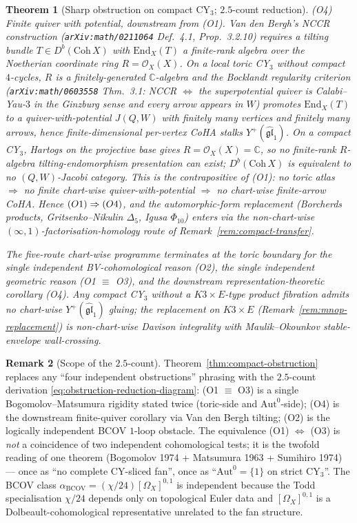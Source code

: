 \documentclass[11pt]{amsart}
\newtheorem{theorem}{Theorem}[section]
\theoremstyle{definition}
\newtheorem{remark}[theorem]{Remark}
\providecommand{\cO}{\mathcal{O}}
\providecommand{\End}{\mathrm{End}}
\providecommand{\bC}{\mathbb{C}}
\providecommand{\fgl}{\mathfrak{gl}}
\begin{document}
\begin{theorem}[Sharp obstruction on compact CY$_3$; $2.5$-count reduction]
\smallskip
\emph{\textup{(O4)} Finite quiver with potential, downstream from
\textup{(O1)}.}
Van den Bergh's NCCR construction (\texttt{arXiv:math/0211064}
Def.~4.1, Prop.~3.2.10) requires a tilting bundle $T \in
D^b(\mathrm{Coh}\,X)$ with $\End_X(T)$ a finite-rank algebra over
the Noetherian coordinate ring $R = \cO_X(X)$. On a local toric
CY$_3$ without compact $4$-cycles, $R$ is a finitely-generated
$\bC$-algebra and the Bocklandt regularity criterion
(\texttt{arXiv:math/0603558} Thm.~3.1: NCCR $\Leftrightarrow$ the
superpotential quiver is Calabi--Yau-$3$ in the Ginzburg sense and
every arrow appears in $W$) promotes $\End_X(T)$ to a
quiver-with-potential $J(Q, W)$ with finitely many vertices and
finitely many arrows, hence finite-dimensional per-vertex CoHA
stalks $Y^+(\widehat{\fgl}_1)$. On a compact CY$_3$, Hartogs on the
projective base gives $R = \cO_X(X) = \bC$, so no finite-rank
$R$-algebra tilting-endomorphism presentation can exist;
$D^b(\mathrm{Coh}\,X)$ is equivalent to no $(Q, W)$-Jacobi category.
This is the contrapositive of (O1): \emph{no toric atlas
$\Rightarrow$ no finite chart-wise quiver-with-potential
$\Rightarrow$ no chart-wise finite-arrow CoHA}. Hence
$\textup{(O1)} \Rightarrow \textup{(O4)}$, and the automorphic-form
replacement (Borcherds products, Gritsenko--Nikulin $\Delta_5$,
Igusa $\Phi_{10}$) enters via the non-chart-wise
$(\infty,1)$-factorisation-homology route of
Remark~\ref{rem:compact-transfer}.

\smallskip
The five-route chart-wise programme terminates at the toric boundary
for the single independent BV-cohomological reason (O2), the single
independent geometric reason (O1 $\equiv$ O3), and the downstream
representation-theoretic corollary (O4). Any compact CY$_3$ without
a $K3 \times E$-type product fibration admits no chart-wise
$Y^+(\widehat{\fgl}_1)$ gluing; the replacement on $K3 \times E$
(Remark~\ref{rem:mnop-replacement}) is non-chart-wise Davison
integrality with Maulik--Okounkov stable-envelope wall-crossing.
\end{theorem}

\begin{remark}[Scope of the $2.5$-count]
\label{rem:obstruction-2p5-scope}
Theorem~\ref{thm:compact-obstruction} replaces any ``four
independent obstructions'' phrasing with the $2.5$-count derivation
\eqref{eq:obstruction-reduction-diagram}: (O1 $\equiv$ O3) is a
single Bogomolov--Matsumura rigidity stated twice (toric-side and
$\mathrm{Aut}^0$-side); (O4) is the downstream finite-quiver
corollary via Van den Bergh tilting; (O2) is the logically
independent BCOV $1$-loop obstacle. The equivalence (O1)
$\Leftrightarrow$ (O3) is \emph{not} a coincidence of two
independent cohomological tests; it is the twofold reading of one
theorem (Bogomolov 1974 + Matsumura 1963 + Sumihiro 1974) --- once as
``no complete CY-sliced fan'', once as ``$\mathrm{Aut}^0 = \{1\}$ on
strict CY$_3$''. The BCOV class $\alpha_{\mathrm{BCOV}} =
(\chi/24)[\Omega_X]^{0,1}$ is independent because the Todd
specialisation $\chi/24$ depends only on topological Euler data and
$[\Omega_X]^{0,1}$ is a Dolbeault-cohomological representative
unrelated to the fan structure.
\end{remark}
\end{document}
